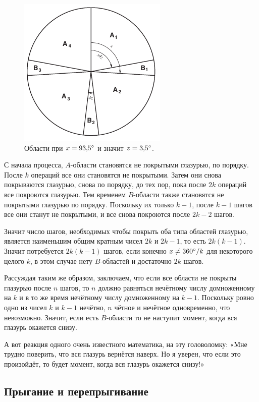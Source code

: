 \begin{figure}[htb!]
\centering
\includegraphics[scale=1]{pics/tort3}
\caption{Области при $x = 93{,}5\degree$ и значит $z = 3{,}5\degree$.}
\label{pic:tort3}
\end{figure}

С начала процесса, $A$-области становятся не покрытыми глазурью, по порядку.
После $k$ операций все они становятся не покрытыми.
Затем они снова покрываются глазурью, снова по порядку, до тех пор, пока после $2k$ операций все покроются глазурью.
Тем временем $B$-области также становятся не покрытыми глазурью по порядку.
Поскольку их только $k - 1$, после $k - 1$ шагов все они станут не покрытыми, и все снова покроются после $2k - 2$ шагов.

Значит число шагов, необходимых чтобы покрыть оба типа областей глазурью, является наименьшим общим кратным чисел $2k$ и $2k - 1$, то есть $2k(k - 1)$.
Значит потребуется $2k(k - 1)$ шагов, если конечно $x \ne 360\degree/k$ для некоторого целого $k$, в этом случае нету $B$-областей и достаточно $2k$ шагов.

Рассуждая таким же образом, заключаем, что если все области не покрыты глазурью после $n$ шагов,
то $n$ должно равняться нечётному числу домноженному на $k$
и в то же время нечётному числу домноженному на $k - 1$.
Поскольку ровно одно из чисел $k$ и $k - 1$ нечётно, $n$ чётное и нечётное одновременно,
что невозможно.
Значит, если есть $B$-области то не наступит момент, когда вся глазурь окажется снизу.

А вот реакция одного очень известного математика, на эту головоломку: «Мне трудно поверить, что вся глазурь вернётся наверх.
Но я уверен, что если это произойдёт, то будет момент, когда вся глазурь окажется снизу!»

\subsection*{Прыгание и перепрыгивание}

